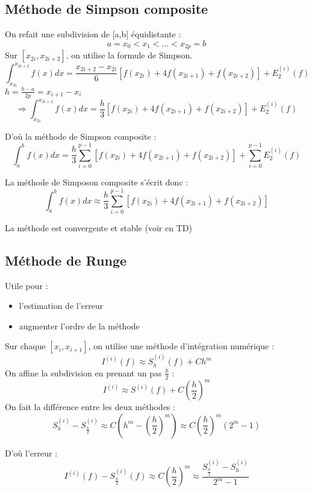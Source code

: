\subsection{Méthode de Simpson composite}
On refait une subdivision de [a,b] équidistante : 
\[a=x_0<x_1<...<x_{2p}=b\]
Sur $[x_{2i},x_{2i+2}]$, on utilise la formule de Simpson.
\[\int_{x_{2i}}^{x_{2i+2}} f(x)dx = \frac{x_{2i+2}-x_{2i}}{6}[f(x_{2i})+4f(x_{2i+1})+f(x_{2i+2})]+E_2^{(i)}(f)\]
$h=\frac{b-a}{2p}=x_{i+1}-x_i$
\[\Rightarrow \int_{x_{2i}}^{x_{2i+2}} f(x)dx = \frac{h}{3}[f(x_{2i})+4f(x_{2i+1})+f(x_{2i+2})]+E_2^{(i)}(f)\]

D'où la méthode de Simpson composite : 
\[\int_{a}^{b} f(x)dx = \frac{h}{3}\sum_{i=0}^{p-1}[f(x_{2i})+4f(x_{2i+1})+f(x_{2i+2})]+\sum_{i=0}^{p-1}E_2^{(i)}(f)\]

La méthode de Simposon composite s'écrit donc :
\[\int_{a}^{b} f(x)dx \approx \frac{h}{3}\sum_{i=0}^{p-1}[f(x_{2i})+4f(x_{2i+1})+f(x_{2i+2})]\]

La méthode est convergente et stable (voir en TD)

\subsection{Méthode de Runge}
Utile pour : \begin{itemize}
	\item l'estimation de l'erreur
	\item augmenter l'ordre de la méthode
\end{itemize}

Sur chaque $[x_i,x_{i+1}]$, on utilise une méthode d'intégration numérique :
\[I^{(i)}(f)\approx S_h^{(i)}(f) + Ch^m\]
On affine la subdivision en prenant un pas $\frac{h}{2}$ :
\[I^{(i)}\approx S^{(i)}(f)+C\left(\frac{h}{2}\right)^m\]
On fait la différence entre les deux méthodes :
\[S_h^{(i)}-S_{\frac{h}{2}}^{(i)}\approx C\left(h^m-\left(\frac{h}{2}\right)^m\right)\approx C\left(\frac{h}{2}\right)^m(2^m-1)\]

D'où l'erreur : 
\[I^{(i)}(f)-S_{\frac{h}{2}}^{(i)}(f)\approx C\left(\frac{h}{2}\right)^m \approx \frac{S_{\frac{h}{2}}^{(i)}-S_h^{(i)}}{2^m-1}\]

